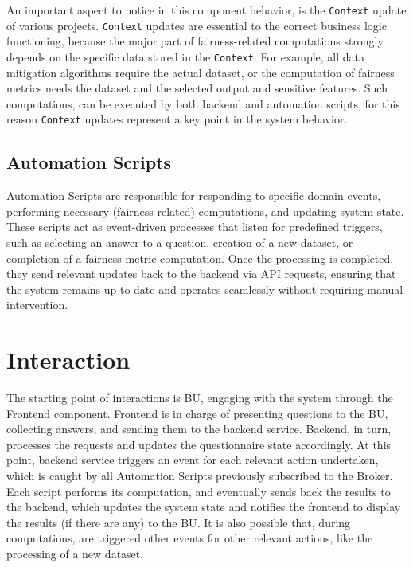 \documentclass[12pt,a4paper,openright,twoside]{book}
\begin{document}
An important aspect to notice in this component behavior, is the \texttt{Context} update of various projects.
%
\texttt{Context} updates are essential to the correct business logic functioning, because the major part of fairness-related computations strongly depends on the specific data stored in the \texttt{Context}.
%
For example, all data mitigation algorithms require the actual dataset, or the computation of fairness metrics needs the dataset and the selected output and sensitive features.
%
Such computations, can be executed by both backend and automation scripts, for this reason \texttt{Context} updates represent a key point in the system behavior.

\subsection{Automation Scripts}

Automation Scripts are responsible for responding to specific domain events, performing necessary (fairness-related) computations, and updating system state.
%
These scripts act as event-driven processes that listen for predefined triggers, such as selecting an answer to a question, creation of a new dataset, or completion of a fairness metric computation.
%
Once the processing is completed, they send relevant updates back to the backend via \ac{API} requests, ensuring that the system remains up-to-date and operates seamlessly without requiring manual intervention.

\section{Interaction}
The starting point of interactions is \ac{BU}, engaging with the system through the Frontend component.
%
Frontend is in charge of presenting questions to the \ac{BU}, collecting answers, and sending them to the backend service.
%
Backend, in turn, processes the requests and updates the questionnaire state accordingly.
%
At this point, backend service triggers an event for each relevant action undertaken, which is caught by all Automation Scripts previously subscribed to the Broker.
%
Each script performs its computation, and eventually sends back the results to the backend, which updates the system state and notifies the frontend to display the results (if there are any) to the \ac{BU}.
%
It is also possible that, during computations, are triggered other events for other relevant actions, like the processing of a new dataset.
\end{document}
